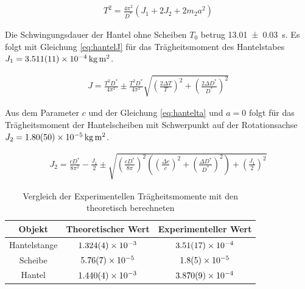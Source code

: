 
\begin{align}
	T^2= \frac{4 \pi^2}{D^*}(J_1+2J_2+2m_2 a^2)
	\label{eq:hantelta}
\end{align}



Die Schwingungsdauer der Hantel ohne Scheiben $T_0$  betrug \SI{13.01 \pm 0.03}{s}. Es folgt mit Gleichung \ref{eq:hantelJ} für das Trägheitsmoment des Hantelstabes $J_1 = \SI{3.511+-0.011e-4}{\kilogram \metre \squared}$.



\begin{align}
	J=\frac{T^2 D^*}{4 \pi^2} \pm \frac{T^2 D^*}{4 \pi^2} \sqrt{
	\left(\frac{2 \Delta T}{T} \right)^2 + 	\left(\frac{2 \Delta D^*}{D^*} \right)^2 }
\label{eq:hantelJ}
\end{align}








Aus dem Parameter $c$ und der Gleichung \ref{eq:hantelta} und $a=0$  folgt für das Trägheitsmoment der Hantelscheiben mit Schwerpunkt auf der Rotationsachse $J_2=\SI{1.80+-0.5e-5 }{\kilogram \metre \squared}$.


\begin{align}
J_2=\frac{c D^*}{8 \pi ^2}-\frac{J_1}{2} \pm \sqrt{\left( \frac{c D^*}{8 \pi}\right) ^2\left( \left( \frac{\Delta c}{c}\right) ^2+  \left( \frac{\Delta D^*}{D^*}\right) ^2\right) + \left(\frac{J_1}{2}\right)^2 }
\end{align}





\begin{table}
\caption{Vergleich der Experimentellen Trägheitsmomente mit den theoretisch berechneten}
\begin{tabular}{|c|c|c|}
	\hline 
Objekt &Theoretischer Wert	& Experimenteller Wert  \\ 
	\hline 
Hantelstange &$\SI{1.324\pm 0.004 e-3}{}$	& $\SI{3.51\pm 0.17e-4}{}$ \\ 
	\hline 
Scheibe&  $\SI{5.76\pm 0.07e-5}{}$	&$\SI{1.8 \pm 0.5  e-05}{}$ \\ 
	\hline 
Hantel &$ \SI{1.440 \pm 0.004e-3}{}$	& $\SI{3.870 \pm 0.009e-4}{}$ \\ 
	\hline 
\end{tabular} 
\end{table}









